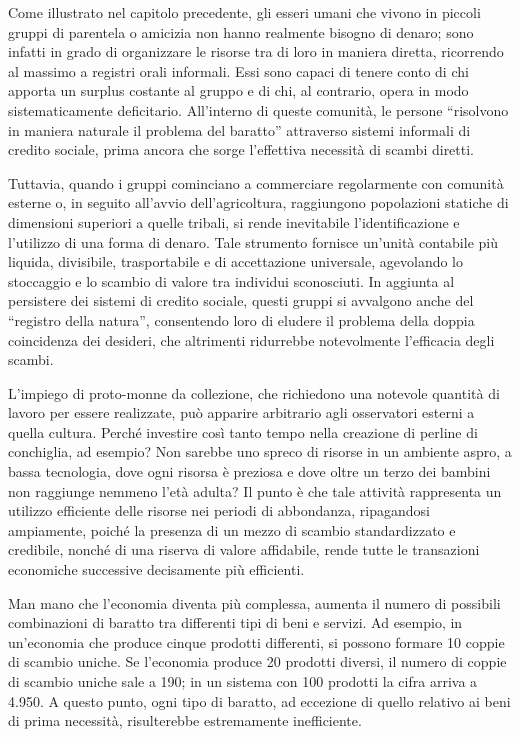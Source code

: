 \documentclass[
  a5paper,
  smalldemyvopaper,10pt,twoside,onecolumn,openright,extrafontsizes,hidelinks]{memoir}
\begin{document}
Come illustrato nel capitolo precedente, gli esseri umani che vivono in
piccoli gruppi di parentela o amicizia non hanno realmente bisogno di
denaro; sono infatti in grado di organizzare le risorse tra di loro in
maniera diretta, ricorrendo al massimo a registri orali informali. Essi
sono capaci di tenere conto di chi apporta un surplus costante al gruppo
e di chi, al contrario, opera in modo sistematicamente deficitario.
All'interno di queste comunità, le persone ``risolvono in maniera
naturale il problema del baratto'' attraverso sistemi informali di
credito sociale, prima ancora che sorge l'effettiva necessità di scambi
diretti.

Tuttavia, quando i gruppi cominciano a commerciare regolarmente con
comunità esterne o, in seguito all'avvio dell'agricoltura, raggiungono
popolazioni statiche di dimensioni superiori a quelle tribali, si rende
inevitabile l'identificazione e l'utilizzo di una forma di denaro. Tale
strumento fornisce un'unità contabile più liquida, divisibile,
trasportabile e di accettazione universale, agevolando lo stoccaggio e
lo scambio di valore tra individui sconosciuti. In aggiunta al
persistere dei sistemi di credito sociale, questi gruppi si avvalgono
anche del ``registro della natura'', consentendo loro di eludere il
problema della doppia coincidenza dei desideri, che altrimenti
ridurrebbe notevolmente l'efficacia degli scambi.

L'impiego di proto-monne da collezione, che richiedono una notevole
quantità di lavoro per essere realizzate, può apparire arbitrario agli
osservatori esterni a quella cultura. Perché investire così tanto tempo
nella creazione di perline di conchiglia, ad esempio? Non sarebbe uno
spreco di risorse in un ambiente aspro, a bassa tecnologia, dove ogni
risorsa è preziosa e dove oltre un terzo dei bambini non raggiunge
nemmeno l'età adulta? Il punto è che tale attività rappresenta un
utilizzo efficiente delle risorse nei periodi di abbondanza, ripagandosi
ampiamente, poiché la presenza di un mezzo di scambio standardizzato e
credibile, nonché di una riserva di valore affidabile, rende tutte le
transazioni economiche successive decisamente più efficienti.

Man mano che l'economia diventa più complessa, aumenta il numero di
possibili combinazioni di baratto tra differenti tipi di beni e servizi.
Ad esempio, in un'economia che produce cinque prodotti differenti, si
possono formare 10 coppie di scambio uniche. Se l'economia produce 20
prodotti diversi, il numero di coppie di scambio uniche sale a 190; in
un sistema con 100 prodotti la cifra arriva a 4.950. A questo punto,
ogni tipo di baratto, ad eccezione di quello relativo ai beni di prima
necessità, risulterebbe estremamente inefficiente.
\end{document}
